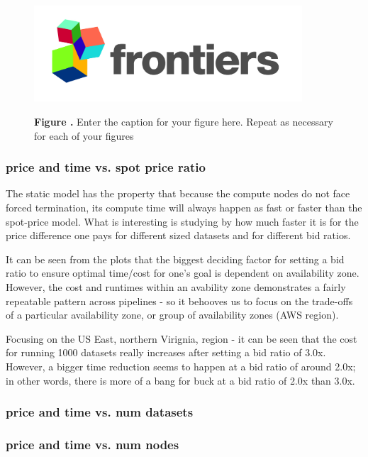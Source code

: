 \documentclass{frontiersSCNS} %
\begin{document}
% 
\begin{figure}[h!]
\begin{center}
\includegraphics[width=10cm]{logo1}%
\end{center}
 \textbf{\label{fig:01} Figure .}{ Enter the caption for your figure here.  Repeat as  necessary for each of your figures }
\end{figure}

\subsubsection{price and time vs. spot price ratio}

The static model has the property that because the compute nodes do not face forced termination, its compute time will always happen as fast or faster than the spot-price model. What is interesting is studying by how much faster it is for the price difference one pays for different sized datasets and for different bid ratios.

It can be seen from the plots that the biggest deciding factor for setting a bid ratio to ensure optimal time/cost for one's goal is dependent on availability zone. However, the cost and runtimes within an avability zone demonstrates a fairly repeatable pattern across pipelines - so it behooves us to focus on the trade-offs of a particular availability zone, or group of availability zones (AWS region). 

Focusing on the US East, northern Virignia, region - it can be seen that the cost for running 1000 datasets really increases after setting a bid ratio of 3.0x. However, a bigger time reduction seems to happen at a bid ratio of around 2.0x; in other words, there is more of a bang for buck at a bid ratio of 2.0x than 3.0x.

\subsubsection{price and time vs. num datasets}
\subsubsection{price and time vs. num nodes}
\end{document}
